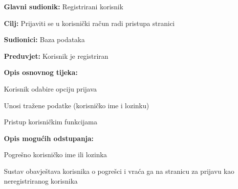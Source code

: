 					\noindent {}
					\begin{packed_item}
	
						\item \textbf{Glavni sudionik: }Registrirani korisnik
						\item  \textbf{Cilj:} Prijaviti se u korisnički račun radi pristupa stranici
						\item  \textbf{Sudionici:} Baza podataka
						\item  \textbf{Preduvjet:} Korisnik je registriran
						\item  \textbf{Opis osnovnog tijeka:}
						
						\item[] \begin{packed_enum}
	
							\item Korisnik odabire opciju prijava
							\item Unosi tražene podatke (korisničko ime i lozinku)
							\item Pristup korisničkim funkcijama
						\end{packed_enum}
						
						\item  \textbf{Opis mogućih odstupanja:}
						
						\item[] \begin{packed_item}
	
							\item[2.a] Pogrešno korisničko ime ili lozinka
							\item[] \begin{packed_enum}
								
								\item Sustav obavještava korisnika o pogrešci i vraća ga na stranicu za prijavu kao neregistriranog korisnika
							
							\end{packed_enum}
							
						\end{packed_item}
					\end{packed_item}
				
